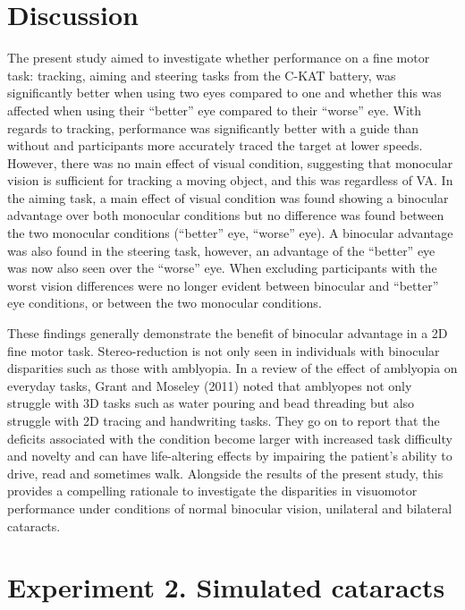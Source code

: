 \documentclass[
  english,
  man,floatsintext]{apa6}
\begin{document}
\hypertarget{discussion}{%
\section{Discussion}\label{discussion}}

The present study aimed to investigate whether performance on a fine motor task: tracking, aiming and steering tasks from the C-KAT battery, was significantly better when using two eyes compared to one and whether this was affected when using their \enquote{better} eye compared to their \enquote{worse} eye.
With regards to tracking, performance was significantly better with a guide than without and participants more accurately traced the target at lower speeds.
However, there was no main effect of visual condition, suggesting that monocular vision is sufficient for tracking a moving object, and this was regardless of VA.
In the aiming task, a main effect of visual condition was found showing a binocular advantage over both monocular conditions but no difference was found between the two monocular conditions (\enquote{better} eye, \enquote{worse} eye).
A binocular advantage was also found in the steering task, however, an advantage of the \enquote{better} eye was now also seen over the \enquote{worse} eye.
When excluding participants with the worst vision differences were no longer evident between binocular and \enquote{better} eye conditions, or between the two monocular conditions.

These findings generally demonstrate the benefit of binocular advantage in a 2D fine motor task.
Stereo-reduction is not only seen in individuals with binocular disparities such as those with amblyopia.
In a review of the effect of amblyopia on everyday tasks, Grant and Moseley (2011) noted that amblyopes not only struggle with 3D tasks such as water pouring and bead threading but also struggle with 2D tracing and handwriting tasks.
They go on to report that the deficits associated with the condition become larger with increased task difficulty and novelty and can have life-altering effects by impairing the patient's ability to drive, read and sometimes walk.
Alongside the results of the present study, this provides a compelling rationale to investigate the disparities in visuomotor performance under conditions of normal binocular vision, unilateral and bilateral cataracts.

\hypertarget{experiment-2.-simulated-cataracts}{%
\section{Experiment 2. Simulated cataracts}\label{experiment-2.-simulated-cataracts}}
\end{document}
